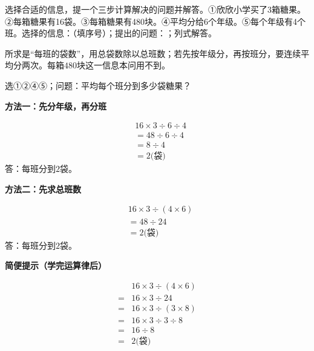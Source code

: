 选择合适的信息，提一个三步计算解决的问题并解答。①欣欣小学买了3箱糖果。②每箱糖果有16袋。③每箱糖果有480块。④平均分给6个年级。⑤每个年级有4个班。选择的信息：\BookBlank{}（填序号）；提出的问题：\BookBlank{}；列式解答。\par
\begin{BookAnswer}
所求是“每班的袋数”，用总袋数除以总班数；若先按年级分，再按班分，要连续平均分两次。每箱\(480\)块这一信息本问用不到。\par 选①②④⑤；问题：平均每个班分到多少袋糖果？\par \par\noindent\begin{minipage}{\linewidth}\textbf{方法一：先分年级，再分班}\par \[\begin{aligned}&16\times3\div6\div4\\&=48\div6\div4\\&=8\div4\\&=2\text{(袋)}\end{aligned}\]答：每班分到\(2\)袋。\end{minipage}\par \par \par\noindent\begin{minipage}{\linewidth}\textbf{方法二：先求总班数}\par \[\begin{aligned}&16\times3\div(4\times6)\\&=48\div24\\&=2\text{(袋)}\end{aligned}\]答：每班分到\(2\)袋。\end{minipage}\par \par\textbf{简便提示（学完运算律后）}\par \[\begin{aligned}&16\times3\div(4\times6)\\={}&16\times3\div24\\={}&16\times3\div(3\times8)\\={}&16\times3\div3\div8\\={}&16\div8\\={}&2\text{(袋)}\end{aligned}\]
\end{BookAnswer}

